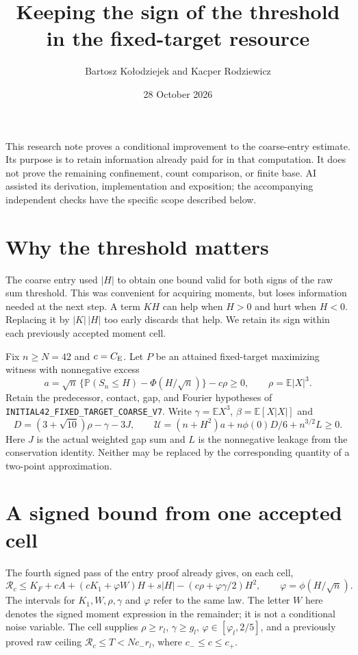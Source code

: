\documentclass[11pt]{article}
\title{Keeping the sign of the threshold in the fixed-target resource}
\author{Bartosz Ko{\l}odziejek and Kacper Rodziewicz}
\date{28 October 2026}
\newcommand{\E}{\mathbb E}\newcommand{\CE}{C_{\rm E}}
\begin{document}
\maketitle
\noindent This research note proves a conditional improvement to the
coarse-entry estimate. Its purpose is to retain information already paid
for in that computation. It does not prove the remaining confinement,
count comparison, or finite base. AI assisted its derivation, implementation
and exposition; the accompanying independent checks have the specific
scope described below.

\section{Why the threshold matters}
The coarse entry used $|H|$ to obtain one bound valid for both signs of the
raw sum threshold. This was convenient for acquiring moments, but loses
information needed at the next step. A term $KH$ can help when $H>0$
and hurt when $H<0$. Replacing it by $|K|\,|H|$ too early discards that help.
We retain its sign within each previously accepted moment cell.

Fix $n\ge N=42$ and $c=\CE$. Let $P$ be an attained fixed-target maximizing
witness with nonnegative excess
\[
 a=\sqrt n\,\{\mathbb P(S_n\le H)-\Phi(H/\sqrt n)\}-c\rho\ge0,
 \qquad \rho=\E|X|^3.
\]
Retain the predecessor, contact, gap, and Fourier hypotheses of
\texttt{INITIAL42\_FIXED\_TARGET\_COARSE\_V7}.
Write $\gamma=\E X^3$, $\beta=\E[X|X|]$ and
\[
 D=(3+\sqrt{10})\rho-\gamma-3J,\qquad
 \mathcal U=(n+H^2)a+n\phi(0)D/6+n^{3/2}L\ge0.
\]
Here $J$ is the actual weighted gap sum and $L$ is the nonnegative
leakage from the conservation identity. Neither may be replaced by the
corresponding quantity of a two-point approximation.

\section{A signed bound from one accepted cell}
The fourth signed pass of the entry proof already gives, on each cell,
\begin{equation}\label{raw}
 \mathcal R_c\le K_F+cA+(cK_1+\varphi W)H+s|H|
       -(c\rho+\varphi\gamma/2)H^2,
 \qquad \varphi=\phi(H/\sqrt n).
\end{equation}
The intervals for $K_1,W,\rho,\gamma$ and $\varphi$ refer to the same law.
The letter $W$ here denotes the signed moment expression in the
remainder; it is not a conditional noise variable.
The cell supplies $\rho\ge r_l$, $\gamma\ge g_l$,
$\varphi\in[\varphi_l,2/5]$, and a previously proved raw ceiling
$\mathcal R_c\le T<Nc_-r_l$, where $c_-\le c\le c_+$.
\end{document}
